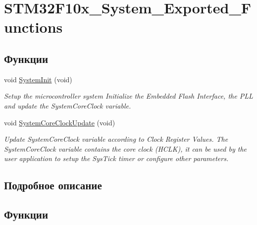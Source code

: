 \hypertarget{group___s_t_m32_f10x___system___exported___functions}{}\section{S\+T\+M32\+F10x\+\_\+\+System\+\_\+\+Exported\+\_\+\+Functions}
\label{group___s_t_m32_f10x___system___exported___functions}
\subsection*{Функции}
\begin{DoxyCompactItemize}
\item 
void \mbox{\hyperlink{group___s_t_m32_f10x___system___exported___functions_ga93f514700ccf00d08dbdcff7f1224eb2}{System\+Init}} (void)
\begin{DoxyCompactList}\small\item\em Setup the microcontroller system Initialize the Embedded Flash Interface, the P\+LL and update the System\+Core\+Clock variable. \end{DoxyCompactList}\item 
void \mbox{\hyperlink{group___s_t_m32_f10x___system___exported___functions_gae0c36a9591fe6e9c45ecb21a794f0f0f}{System\+Core\+Clock\+Update}} (void)
\begin{DoxyCompactList}\small\item\em Update System\+Core\+Clock variable according to Clock Register Values. The System\+Core\+Clock variable contains the core clock (H\+C\+LK), it can be used by the user application to setup the Sys\+Tick timer or configure other parameters. \end{DoxyCompactList}\end{DoxyCompactItemize}


\subsection{Подробное описание}


\subsection{Функции}
\mbox{\label{group___s_t_m32_f10x___system___exported___functions_gae0c36a9591fe6e9c45ecb21a794f0f0f}} 
